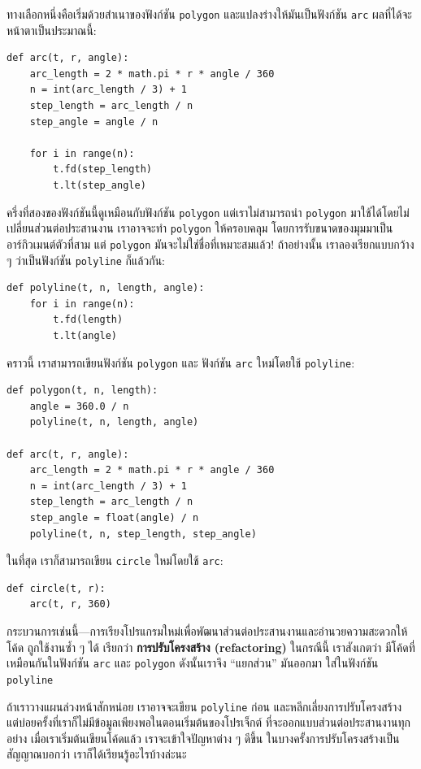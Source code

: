 ทางเลือกหนึ่งคือเริ่มด้วยสำเนาของฟังก์ชัน {\tt polygon} และแปลงร่างให้มันเป็นฟังก์ชัน {\tt arc}
ผลที่ได้จะหน้าตาเป็นประมาณนี้:

\begin{verbatim}
def arc(t, r, angle):
    arc_length = 2 * math.pi * r * angle / 360
    n = int(arc_length / 3) + 1
    step_length = arc_length / n
    step_angle = angle / n
    
    for i in range(n):
        t.fd(step_length)
        t.lt(step_angle)
\end{verbatim}
%
ครึ่งที่สองของฟังก์ชันนี้ดูเหมือนกับฟังก์ชัน {\tt polygon} แต่เราไม่สามารถนำ {\tt polygon} 
มาใช้ได้โดยไม่เปลี่ยนส่วนต่อประสานงาน เราอาจจะทำ {\tt polygon} ให้ครอบคลุม โดยการรับขนาดของมุมมาเป็นอาร์กิวเมนต์ตัวที่สาม แต่ {\tt polygon} มันจะไม่ใช่ชื่อที่เหมาะสมแล้ว! ถ้าอย่างนั้น 
เราลองเรียกแบบกว้าง ๆ ว่าเป็นฟังก์ชัน {\tt polyline} ก็แล้วกัน: 

\begin{verbatim}
def polyline(t, n, length, angle):
    for i in range(n):
        t.fd(length)
        t.lt(angle)
\end{verbatim}
%
คราวนี้ เราสามารถเขียนฟังก์ชัน {\tt polygon} และ ฟังก์ชัน {\tt arc} ใหม่โดยใช้ {\tt polyline}:

\begin{verbatim}
def polygon(t, n, length):
    angle = 360.0 / n
    polyline(t, n, length, angle)

def arc(t, r, angle):
    arc_length = 2 * math.pi * r * angle / 360
    n = int(arc_length / 3) + 1
    step_length = arc_length / n
    step_angle = float(angle) / n
    polyline(t, n, step_length, step_angle)
\end{verbatim}
%
ในที่สุด เราก็สามารถเขียน {\tt circle} ใหม่โดยใช้ {\tt arc}:

\begin{verbatim}
def circle(t, r):
    arc(t, r, 360)
\end{verbatim}
%
กระบวนการเช่นนี้---การเรียงโปรแกรมใหม่เพื่อพัฒนาส่วนต่อประสานงานและอำนวยความสะดวกให้โค้ด
ถูกใช้งานซ้ำ ๆ ได้ เรียกว่า {\bf การปรับโครงสร้าง (refactoring)}  ในกรณีนี้ เราสังเกตว่า
มีโค้ดที่เหมือนกันในฟังก์ชัน {\tt arc} และ {\tt polygon} ดังนั้นเราจึง ``แยกส่วน'' มันออกมา
ใส่ในฟังก์ชัน {\tt polyline}

ถ้าเราวางแผนล่วงหน้าสักหน่อย เราอาจจะเขียน {\tt polyline} ก่อน และหลีกเลี่ยงการปรับโครงสร้าง
แต่บ่อยครั้งที่เราก็ไม่มีข้อมูลเพียงพอในตอนเริ่มต้นของโปรเจ็กต์ ที่จะออกแบบส่วนต่อประสานงานทุกอย่าง
เมื่อเราเริ่มต้นเขียนโค้ดแล้ว เราจะเข้าใจปัญหาต่าง ๆ ดีขึ้น ในบางครั้งการปรับโครงสร้างเป็นสัญญาณบอกว่า
เราก็ได้เรียนรู้อะไรบ้างล่ะนะ


